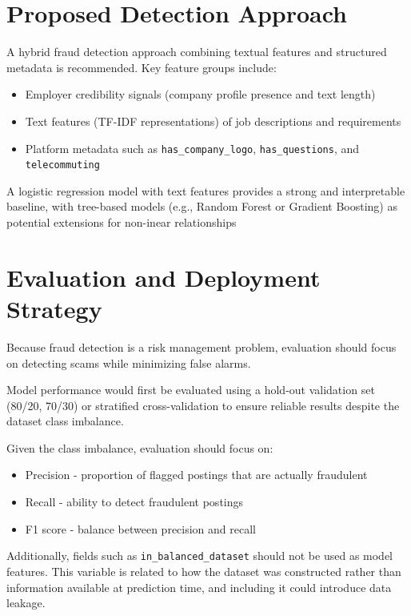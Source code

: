 \documentclass[11pt]{article}
\begin{document}
\section{Proposed Detection Approach}

A hybrid fraud detection approach combining textual features and structured metadata is recommended. Key feature groups include:
\begin{itemize}
\item Employer credibility signals (company profile presence and text length)
\item Text features (TF-IDF representations) of job descriptions and requirements
\item Platform metadata such as \texttt{has\_company\_logo}, \texttt{has\_questions}, and \texttt{telecommuting}
\end{itemize}

A logistic regression model with text features provides a strong and interpretable baseline, with tree-based models (e.g., Random Forest or Gradient Boosting) as potential extensions for non-inear relationships

\section{Evaluation and Deployment Strategy}

Because fraud detection is a risk management problem, evaluation should focus on detecting scams while minimizing false alarms.

Model performance would first be evaluated using a hold-out validation set (80/20, 70/30) or stratified cross-validation to ensure reliable results despite the dataset class imbalance.

Given the class imbalance, evaluation should focus on:

\begin{itemize}
\item Precision - proportion of flagged postings that are actually fraudulent
\item Recall - ability to detect fraudulent postings
\item F1 score - balance between precision and recall
\end{itemize}

Additionally, fields such as \texttt{in\_balanced\_dataset} should not be used as model features. This variable is related to how the dataset was constructed rather than information available at prediction time, and including it could introduce data leakage.
\end{document}
